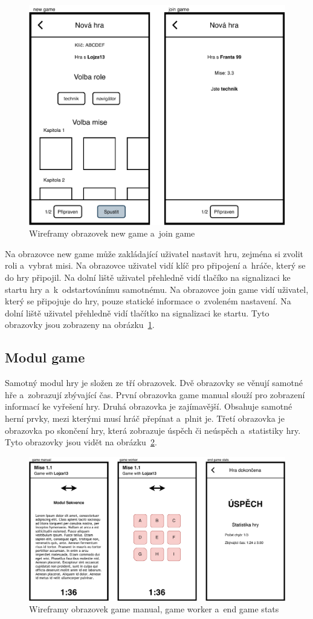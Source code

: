 \begin{figure}
    \centering
    \includegraphics[width=0.6\linewidth]{assets/design/wireframes/lobby.pdf}
    \caption{Wireframy obrazovek new game a~join game}
    \label{fig:ui-lobby}
\end{figure}

\pagebreak
Na obrazovce new game může zakládající uživatel nastavit hru,
zejména si zvolit roli a~vybrat misi.
Na obrazovce uživatel vidí klíč pro připojení a~hráče,
který se do hry připojil.
Na dolní liště uživatel přehledně vidí tlačíko na signalizaci ke startu hry
a~k~odstartovánímu samotnému.
Na obrazovce join game vidí uživatel,
který se připojuje do hry,
pouze statické informace o~zvoleném nastavení.
Na dolní liště uživatel přehledně vidí tlačítko na signalizaci ke startu.
Tyto obrazovky jsou zobrazeny na obrázku~\ref{fig:ui-lobby}.

\subsection{Modul game}

Samotný modul hry je složen ze tří obrazovek.
Dvě obrazovky se věnují samotné hře a~zobrazují zbývající čas.
První obrazovka game manual slouží pro zobrazení informací ke vyřešení hry.
Druhá obrazovka je zajímavější.
Obsahuje samotné herní prvky,
mezi kterými musí hráč přepínat a~plnit je.
Třetí obrazovka je obrazovka po skončení hry,
která zobrazuje úspěch či neúspěch
a~statistiky hry.
Tyto obrazovky jsou vidět na obrázku~\ref{fig:ui-game}.

\begin{figure}
    \centering
    \includegraphics[width=1\linewidth]{assets/design/wireframes/game.pdf}
    \caption{Wireframy obrazovek game manual, game worker a~end game stats}
    \label{fig:ui-game}
\end{figure}
